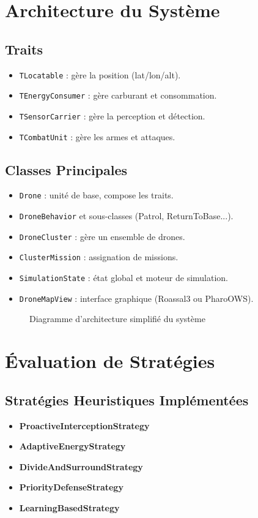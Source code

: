 \documentclass[a4paper,11pt]{article}
\begin{document}
\section{Architecture du Système}
\subsection{Traits}
\begin{itemize}
  \item \texttt{TLocatable} : gère la position (lat/lon/alt).
  \item \texttt{TEnergyConsumer} : gère carburant et consommation.
  \item \texttt{TSensorCarrier} : gère la perception et détection.
  \item \texttt{TCombatUnit} : gère les armes et attaques.
\end{itemize}

\subsection{Classes Principales}
\begin{itemize}
  \item \texttt{Drone} : unité de base, compose les traits.
  \item \texttt{DroneBehavior} et sous-classes (Patrol, ReturnToBase...).
  \item \texttt{DroneCluster} : gère un ensemble de drones.
  \item \texttt{ClusterMission} : assignation de missions.
  \item \texttt{SimulationState} : état global et moteur de simulation.
  \item \texttt{DroneMapView} : interface graphique (Roassal3 ou PharoOWS).
\end{itemize}

\begin{figure}[h!]
\centering
{}
\caption{Diagramme d’architecture simplifié du système}
\end{figure}

\section{Évaluation de Stratégies}
\subsection{Stratégies Heuristiques Implémentées}
\begin{itemize}
  \item \textbf{ProactiveInterceptionStrategy}
  \item \textbf{AdaptiveEnergyStrategy}
  \item \textbf{DivideAndSurroundStrategy}
  \item \textbf{PriorityDefenseStrategy}
  \item \textbf{LearningBasedStrategy}
\end{itemize}
\end{document}
